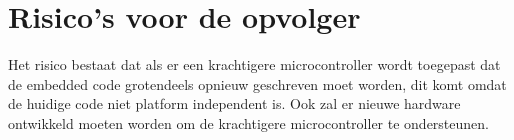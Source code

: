 \section{Risico's voor de opvolger}
Het risico bestaat dat als er een krachtigere microcontroller wordt toegepast dat de embedded code grotendeels opnieuw geschreven moet worden, dit komt omdat de huidige code niet platform independent is. Ook zal er nieuwe hardware ontwikkeld moeten worden om de krachtigere microcontroller te ondersteunen.

